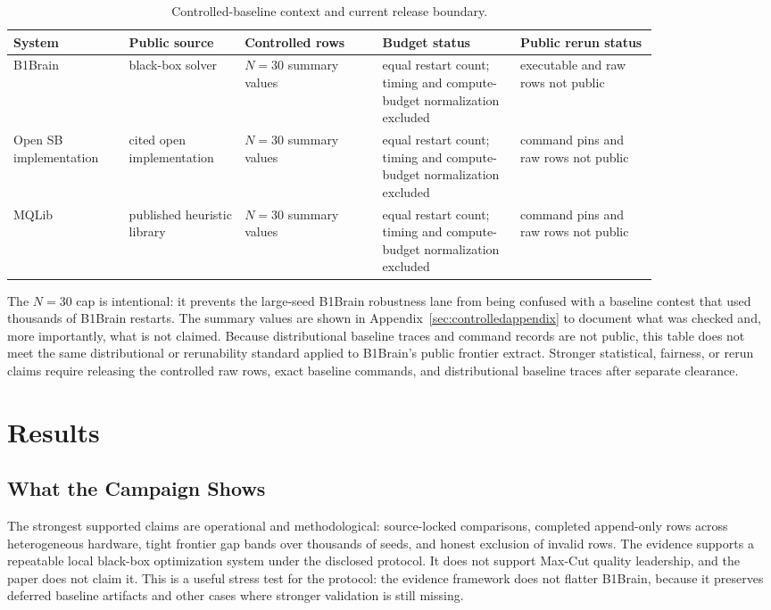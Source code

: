 \documentclass[11pt]{article}
\begin{document}
\begin{table}[tbp]
\centering
\caption{Controlled-baseline context and current release boundary.}
\label{tab:baselineprotocol}
\footnotesize
\begin{tabular}{@{}L{0.15\linewidth}L{0.15\linewidth}L{0.18\linewidth}L{0.18\linewidth}L{0.18\linewidth}@{}}
\toprule
System & Public source & Controlled rows & Budget status & Public rerun status \\
\midrule
B1Brain & black-box solver & $N=30$ summary values & equal restart count; timing and compute-budget normalization excluded & executable and raw rows not public \\
Open SB implementation & cited open implementation & $N=30$ summary values & equal restart count; timing and compute-budget normalization excluded & command pins and raw rows not public \\
MQLib & published heuristic library & $N=30$ summary values & equal restart count; timing and compute-budget normalization excluded & command pins and raw rows not public \\
\bottomrule
\end{tabular}
\end{table}

The $N=30$ cap is intentional: it prevents the large-seed B1Brain robustness lane from being confused with a baseline contest that used thousands of B1Brain restarts. The summary values are shown in Appendix~\ref{sec:controlledappendix} to document what was checked and, more importantly, what is not claimed. Because distributional baseline traces and command records are not public, this table does not meet the same distributional or rerunability standard applied to B1Brain's public frontier extract. Stronger statistical, fairness, or rerun claims require releasing the controlled raw rows, exact baseline commands, and distributional baseline traces after separate clearance.

\section{Results}
\subsection{What the Campaign Shows}
The strongest supported claims are operational and methodological: source-locked comparisons, completed append-only rows across heterogeneous hardware, tight frontier gap bands over thousands of seeds, and honest exclusion of invalid rows. The evidence supports a repeatable local black-box optimization system under the disclosed protocol. It does not support Max-Cut quality leadership, and the paper does not claim it. This is a useful stress test for the protocol: the evidence framework does not flatter B1Brain, because it preserves deferred baseline artifacts and other cases where stronger validation is still missing.
\end{document}
